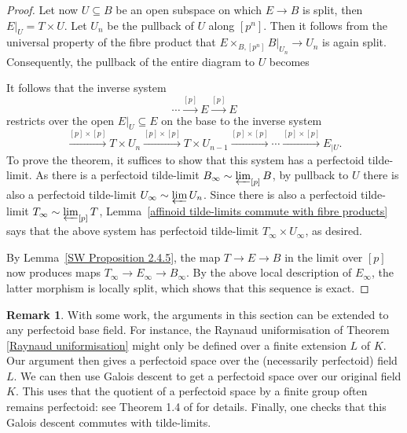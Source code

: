 \documentclass[10pt,oneside]{amsart}
\theoremstyle{definition}
\newtheorem{remark}[theorem]{Remark}
\newcommand{\id}{{\operatorname{id}}}
\begin{document}
\begin{proof}
			Let now $U\subseteq B$ be an open subspace on which $E\to B$ is split, then $E|_U=T\times U$. Let $U_n$ be the pullback of $U$ along $[p^n]$. Then it follows from the universal property of the fibre product that $E\times_{B,[p^n]}B|_{U_n}\to U_n$ is again split. Consequently, the pullback of the entire diagram to $U$ becomes
					\begin{center}
						\end{center}
				It follows that the inverse system \[\cdots \xrightarrow{[p]}E\xrightarrow{[p]}E\]
			 	restricts over the open $E|_U\subseteq E$ on the base to the inverse system
				\[\xrightarrow{[p]\times [p]}T\times U_n\xrightarrow{[p]\times [p]}T\times U_{n-1}\xrightarrow{[p]\times [p]}\cdots \xrightarrow{[p]\times [p]}E_{|U}. \]
				To prove the theorem, it suffices to show that this system has a perfectoid tilde-limit.
				As there is a perfectoid tilde-limit $B_\infty\sim \varprojlim_{[p]} B$, by pullback to $U$ there is also a perfectoid tilde-limit $U_\infty\sim \varprojlim U_n$. Since there is also a perfectoid tilde-limit $T_\infty\sim \varprojlim_{[p]} T$,  Lemma~\ref{affinoid tilde-limits commute with fibre products} says that the above system has perfectoid tilde-limit $T_\infty\times U_\infty$, as desired.
				
				By Lemma~\ref{SW Proposition 2.4.5}, the map $T\to E\to B$ in the limit over $[p]$ now produces maps $T_\infty \to E_\infty\to B_\infty$. By the above local description of $E_\infty$, the latter morphism is locally split, which shows that this sequence is exact.
	\end{proof}
	
	\begin{remark}\label{general fields for E}
	With some work, the arguments in this section can be extended to any perfectoid base field. For instance, the Raynaud uniformisation of Theorem \ref{Raynaud uniformisation} might only be defined over a finite extension $L$ of $K$. Our argument then gives a perfectoid space over the (necessarily perfectoid) field $L$. We can then use Galois descent to get a perfectoid space over our original field $K$. This uses that the quotient of a perfectoid space by a finite group often remains perfectoid: see Theorem 1.4 of \cite{Hansen_quotients} for details. Finally, one checks that this Galois descent commutes with tilde-limits. 
	\end{remark}
\end{document}
